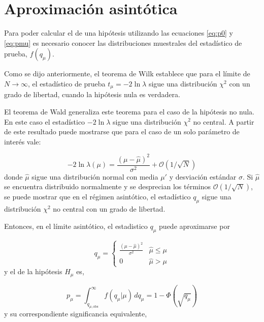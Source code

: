 \section{Aproximación asintótica}\label{sec:aprox}

Para poder calcular el {\pvalue} de una hipótesis utilizando las ecuaciones
\eqref{eq:p0} y \eqref{eq:pmu} es necesario conocer las distribuciones muestrales
del estadístico de prueba, $f(q_\mu)$.

Como se dijo anteriormente, el teorema de Wilk establece que para el límite de
$N\to\infty$, el estadístico de prueba $t_\mu = -2\ln \lambda$ sigue una
distribución $\chi^2$ con un grado de libertad, cuando la hipótesis nula es verdadera.

El teorema de Wald\cite{WaldTheo} generaliza este teorema para el caso de la hipótesis no nula.
En este caso el estadístico $-2\ln\lambda$ sigue una distribución $\chi^2$ no central.
A partir de este resultado puede mostrarse que para el caso de un solo parámetro de interés vale:

\begin{equation}
  -2 \ln \lambda(\mu) = \frac{(\mu - \hat{\mu})^2}{\sigma^2} + \mathcal{O}(1/\sqrt{N})
\end{equation}
%
donde $\hat{\mu}$ sigue una distribución normal con media $\mu'$ y desviación
estándar $\sigma$. Si $\hat{\mu}$ se encuentra distribuido normalmente y se
desprecian los términos $\mathcal{O}(1/\sqrt{N})$, se puede mostrar que en el
régimen asintótico, el estadístico $q_\mu$ sigue una distribución $\chi^2$ no
central con un grado de libertad.

Entonces, en el límite asintótico, el estadistico $q_\mu$ puede aproximarse por

\begin{equation}
  q_\mu =
  \begin{cases}
    \frac{(\mu-\hat{\mu})^2}{\sigma^2} & \hat{\mu} \leq \mu \\
    0 & \hat{\mu} > \mu
  \end{cases}
\end{equation}
%
y el {\pvalue} de la hipótesis $H_\mu$ es,

\begin{equation}
  p_\mu = \int_{q_{\mu,\text{obs}}}^{\infty} f(q_\mu|\mu) \, dq_\mu = 1 - \Phi(\sqrt{q_\mu})
\end{equation}
%
y su correspondiente significancia equivalente,

